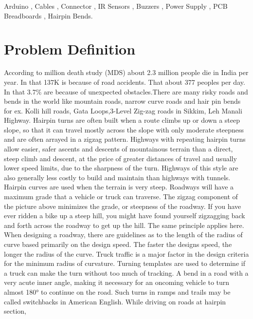 \documentclass[conference]{IEEEtran}
\begin{document}
    \begin{IEEEkeywords}
        Arduino , Cables , Connector , IR Sensors , Buzzers , Power Supply , PCB Breadboards , Hairpin Bends.
    \end{IEEEkeywords}

    \section{Problem Definition}
    According to million death study (MDS) about 2.3 million people die in India per year. In that 137K is because of road accidents.
    That about 377 peoples per day. In that 3.7\% are because of unexpected obstacles.There are many risky roads and bends in the world
    like mountain roads, narrow curve roads and hair pin bends for ex. Kolli hill roads, Gata Loops,3-Level Zig-zag roads in Sikkim,
    Leh Manali Highway.
    \newline
         Hairpin turns are often built when a route climbs up or down a steep slope, so that it can travel mostly
    across the slope with only moderate steepness and are often arrayed in a zigzag pattern. Highways with
    repeating hairpin turns allow easier, safer ascents and descents of mountainous terrain than a direct, steep
    climb and descent, at the price of greater distances of travel and usually lower speed limits, due to the
    sharpness of the turn. Highways of this style are also generally less costly to build and maintain than
    highways with tunnels. Hairpin curves are used when the terrain is very steep. Roadways will have a
    maximum grade that a vehicle or truck can traverse. The zigzag component of the picture above minimizes
    the grade, or steepness of the roadway. If you have ever ridden a bike up a steep hill, you might have found
    yourself zigzagging back and forth across the roadway to get up the hill. The same principle applies here.
    When designing a roadway, there are guidelines as to the length of the radius of curve based primarily on
    the design speed. The faster the designs speed, the longer the radius of the curve. Truck traffic is a major
    factor in the design criteria for the minimum radius of curvature. Turning templates are used to determine if
    a truck can make the turn without too much of tracking. A bend in a road with a very acute inner angle,
    making it necessary for an oncoming vehicle to turn almost 180° to continue on the road. Such turns in
    ramps and trails may be called switchbacks in American English. While driving on roads at hairpin section,
\end{document}
